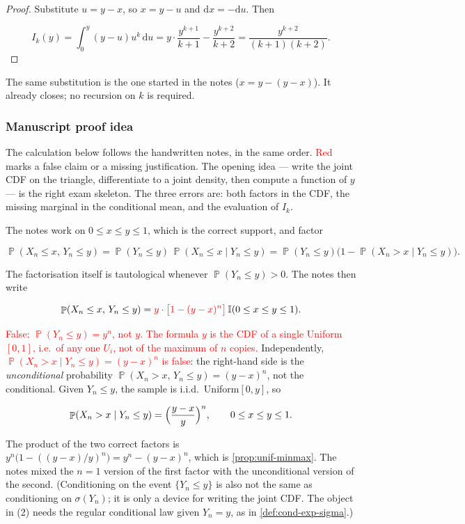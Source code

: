 \documentclass[11pt,a4paper]{article}
\newcommand{\mserr}[1]{\textcolor{red}{#1}}
\DeclareMathOperator{\Pbb}{\mathbb{P}}
\begin{document}
\begin{proof}
Substitute \( u=y-x \), so \( x=y-u \) and \( \mathrm{d}x=-\mathrm{d}u \). Then

\[
I_{k}(y)
=
\int_{0}^{y}(y-u)u^{k}\,\mathrm{d}u
=
y\cdot\frac{y^{k+1}}{k+1}-\frac{y^{k+2}}{k+2}
=
\frac{y^{k+2}}{(k+1)(k+2)}.
\]
\end{proof}

The same substitution is the one started in the notes (\( x=y-(y-x) \)). It already closes; no recursion on \( k \) is required.

\subsubsection{Manuscript proof idea}

The calculation below follows the handwritten notes, in the same order. \mserr{Red} marks a false claim or a missing justification. The opening idea --- write the joint CDF on the triangle, differentiate to a joint density, then compute a function of \( y \) --- is the right exam skeleton. The three errors are: both factors in the CDF, the missing marginal in the conditional mean, and the evaluation of \( I_{k} \).

The notes work on \( 0\le x\le y\le 1 \), which is the correct support, and factor

\[
\Pbb(X_{n}\le x,\,Y_{n}\le y)
=
\Pbb(Y_{n}\le y)\,\Pbb(X_{n}\le x\mid Y_{n}\le y)
=
\Pbb(Y_{n}\le y)\bigl(1-\Pbb(X_{n}>x\mid Y_{n}\le y)\bigr).
\]

The factorisation itself is tautological whenever \( \Pbb(Y_{n}\le y)>0 \). The notes then write

\[
\Pbb(X_{n}\le x,\,Y_{n}\le y)
=
\mserr{y\cdot\bigl[1-(y-x)^{n}\bigr]}\,\mathbb{I}(0\le x\le y\le 1).
\]

\mserr{False: \(\Pbb(Y_{n}\le y)=y^{n}\), not \( y \). The formula \( y \) is the CDF of a single Uniform\( [0,1] \), i.e.\ of any one \( U_{i} \), not of the maximum of \( n \) copies.} Independently, \mserr{\(\Pbb(X_{n}>x\mid Y_{n}\le y)=(y-x)^{n}\) is false}: the right-hand side is the \emph{unconditional} probability \( \Pbb(X_{n}>x,\,Y_{n}\le y)=(y-x)^{n} \), not the conditional. Given \( Y_{n}\le y \), the sample is i.i.d.\ Uniform\( [0,y] \), so

\[
\Pbb(X_{n}>x\mid Y_{n}\le y)
=
\Bigl(\frac{y-x}{y}\Bigr)^{n},
\qquad
0\le x\le y\le 1.
\]

The product of the two correct factors is \( y^{n}\bigl(1-((y-x)/y)^{n}\bigr)=y^{n}-(y-x)^{n} \), which is \cref{prop:unif-minmax}. The notes mixed the \( n=1 \) version of the first factor with the unconditional version of the second. (Conditioning on the event \( \{Y_{n}\le y\} \) is also not the same as conditioning on \( \sigma(Y_{n}) \); it is only a device for writing the joint CDF. The object in (2) needs the regular conditional law given \( Y_{n}=y \), as in \cref{def:cond-exp-sigma}.)
\end{document}

